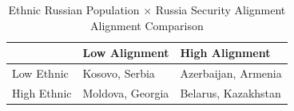 \begin{table}[!t]
\caption*{
{\large Ethnic Russian Population × Russia Security Alignment} \\ 
{\small Alignment Comparison}
} 
\fontsize{12.0pt}{14.4pt}\selectfont
\begin{tabular*}{\linewidth}{@{\extracolsep{\fill}}lll}
\toprule
 & Low Alignment & High Alignment \\ 
\midrule\addlinespace[2.5pt]
Low Ethnic & {Kosovo, Serbia} & {Azerbaijan, Armenia} \\ 
High Ethnic & {Moldova, Georgia} & {Belarus, Kazakhstan} \\ 
\bottomrule
\end{tabular*}
\end{table}

